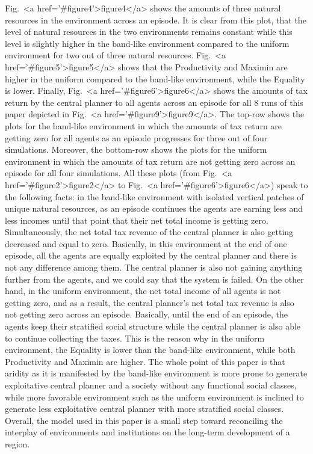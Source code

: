 \documentclass{article}
\begin{document}
Fig.~<a href='#figure4'>figure4</a> shows the amounts of three natural resources in the environment across an episode. It is clear from this plot, that the level of natural resources in the two environments remains constant while this level is slightly higher in the band-like environment compared to the uniform environment for two out of three natural resources. Fig.~<a href='#figure5'>figure5</a> shows that the Productivity and Maximin are higher in the uniform compared to the band-like environment, while the Equality is lower. Finally, Fig.~<a href='#figure6'>figure6</a> shows the amounts of tax return by the central planner to all agents across an episode for all 8 runs of this paper depicted in Fig.~<a href='#figure9'>figure9</a>. The top-row shows the plots for the band-like environment in which the amounts of tax return are getting zero for all agents as an episode progresses for three out of four simulations. Moreover, the bottom-row shows the plots for the uniform environment in which the amounts of tax return are not getting zero across an episode for all four simulations. All these plots (from Fig.~<a href='#figure2'>figure2</a> to Fig.~<a href='#figure6'>figure6</a>) speak to the following facts: in the band-like environment with isolated vertical patches of unique natural resources, as an episode continues the agents are earning less and less incomes until that point that their net total income is getting zero. Simultaneously, the net total tax revenue of the central planner is also getting decreased and equal to zero. Basically, in this environment at the end of one episode, all the agents are equally exploited by the central planner and there is not any difference among them. The central planner is also not gaining anything further from the agents, and we could say that the system is failed. On the other hand, in the uniform environment, the net total income of all agents is not getting zero, and as a result, the central planner's net total tax revenue is also not getting zero across an episode. Basically, until the end of an episode, the agents keep their stratified social structure while the central planner is also able to continue collecting the taxes. This is the reason why in the uniform environment, the Equality is lower than the band-like environment, while both Productivity and Maximin are higher. The whole point of this paper is that aridity as it is manifested by the band-like environment is more prone to generate exploitative central planner and a society without any functional social classes, while more favorable environment such as the uniform environment is inclined to generate less exploitative central planner with more stratified social classes. Overall, the model used in this paper is a small step toward reconciling the interplay of environments and institutions on the long-term development of a region.
\end{document}
